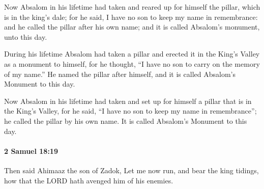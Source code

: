 			\begin{versebox}
					\item[BHS] 
					\item[ASV] Now Absalom in his lifetime had taken and reared up for himself the pillar, which is in the king's dale; for he said, I have no son to keep my name in remembrance: and he called the pillar after his own name; and it is called Absalom's monument, unto this day.
					\item[NIV] During his lifetime Absalom had taken a pillar and erected it in the King’s Valley as a monument to himself, for he thought, “I have no son to carry on the memory of my name.” He named the pillar after himself, and it is called Absalom’s Monument to this day.
					\item[NRSV] Now Absalom in his lifetime had taken and set up for himself a pillar that is in the King’s Valley, for he said, “I have no son to keep my name in remembrance”; he called the pillar by his own name. It is called Absalom’s Monument to this day.
			\end{versebox}

		\paragraph{2 Samuel 18:19} %
			\label{2SAMUEL-18-19}

			Then said Ahimaaz the son of Zadok, Let me now run, and bear the king tidings, how that the LORD hath avenged him of his enemies.

